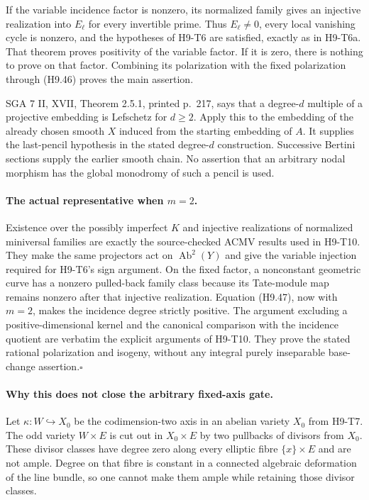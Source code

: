 \documentclass[11pt,a4paper]{article}
\begin{document}
If the variable incidence factor is nonzero, its normalized family
gives an injective realization into $E_\ell$ for every invertible
prime. Thus $E_\ell\ne0$, every local vanishing cycle is nonzero,
and the hypotheses of H9-T6 are satisfied, exactly as in H9-T6a.
That theorem proves positivity of the variable factor. If it is zero,
there is nothing to prove on that factor. Combining its polarization
with the fixed polarization through (H9.46) proves the main assertion.

SGA 7 II, XVII, Theorem 2.5.1, printed p.~217, says that a degree-$d$
multiple of a projective embedding is Lefschetz for $d\ge2$. Apply
this to the embedding of the already chosen smooth $X$ induced from
the starting embedding of $A$. It supplies the last-pencil hypothesis
in the stated degree-$d$ construction. Successive Bertini sections
supply the earlier smooth chain. No assertion that an arbitrary
nodal morphism has the global monodromy of such a pencil is used.

\paragraph{The actual representative when $m=2$.}
Existence over the possibly imperfect $K$ and injective realizations
of normalized miniversal families are exactly the source-checked
ACMV results used in H9-T10. They make the same projectors act on
$\operatorname{Ab}^2(Y)$ and give the variable injection required
for H9-T6's sign argument. On the fixed factor, a nonconstant
geometric curve has a nonzero pulled-back family class because its
Tate-module map remains nonzero after that injective realization.
Equation (H9.47), now with $m=2$, makes the incidence degree strictly
positive. The argument excluding a positive-dimensional kernel and
the canonical comparison with the incidence quotient are verbatim
the explicit arguments of H9-T10. They prove the stated rational
polarization and isogeny, without any integral purely inseparable
base-change assertion.\hfill$\square$

\paragraph{Why this does not close the arbitrary fixed-axis gate.}
Let $\kappa:W\hookrightarrow X_0$ be the codimension-two axis in
an abelian variety $X_0$ from H9-T7. The odd variety $W\times E$ is
cut out in $X_0\times E$ by two pullbacks of divisors from $X_0$.
These divisor classes have degree zero along every elliptic fibre
$\{x\}\times E$ and are not ample. Degree on that fibre is constant
in a connected algebraic deformation of the line bundle, so one
cannot make them ample while retaining those divisor classes.
\end{document}
